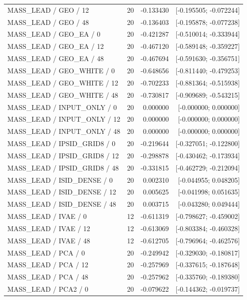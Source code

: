 \begin{longtable}{p{.56\linewidth}rrr}
MASS\_LEAD / GEO / 12 & 20 & -0.133430 & [-0.195505; -0.072244] \\
MASS\_LEAD / GEO / 48 & 20 & -0.136403 & [-0.195878; -0.077238] \\
MASS\_LEAD / GEO\_EA / 0 & 20 & -0.421287 & [-0.510014; -0.333944] \\
MASS\_LEAD / GEO\_EA / 12 & 20 & -0.467120 & [-0.589148; -0.359227] \\
MASS\_LEAD / GEO\_EA / 48 & 20 & -0.467694 & [-0.591630; -0.356751] \\
MASS\_LEAD / GEO\_WHITE / 0 & 20 & -0.648656 & [-0.811440; -0.479253] \\
MASS\_LEAD / GEO\_WHITE / 12 & 20 & -0.702233 & [-0.881364; -0.515938] \\
MASS\_LEAD / GEO\_WHITE / 48 & 20 & -0.730817 & [-0.909689; -0.543215] \\
MASS\_LEAD / INPUT\_ONLY / 0 & 20 & 0.000000 & [-0.000000; 0.000000] \\
MASS\_LEAD / INPUT\_ONLY / 12 & 20 & 0.000000 & [-0.000000; 0.000000] \\
MASS\_LEAD / INPUT\_ONLY / 48 & 20 & 0.000000 & [-0.000000; 0.000000] \\
MASS\_LEAD / IPSID\_GRID8 / 0 & 20 & -0.219644 & [-0.327051; -0.122800] \\
MASS\_LEAD / IPSID\_GRID8 / 12 & 20 & -0.298878 & [-0.430462; -0.173934] \\
MASS\_LEAD / IPSID\_GRID8 / 48 & 20 & -0.331815 & [-0.462729; -0.212094] \\
MASS\_LEAD / ISID\_DENSE / 0 & 20 & 0.002310 & [-0.044955; 0.048205] \\
MASS\_LEAD / ISID\_DENSE / 12 & 20 & 0.005625 & [-0.041998; 0.051635] \\
MASS\_LEAD / ISID\_DENSE / 48 & 20 & 0.003715 & [-0.043280; 0.049444] \\
MASS\_LEAD / IVAE / 0 & 12 & -0.611319 & [-0.798627; -0.459002] \\
MASS\_LEAD / IVAE / 12 & 12 & -0.613069 & [-0.803384; -0.460328] \\
MASS\_LEAD / IVAE / 48 & 12 & -0.612705 & [-0.796964; -0.462576] \\
MASS\_LEAD / PCA / 0 & 20 & -0.249942 & [-0.329030; -0.180817] \\
MASS\_LEAD / PCA / 12 & 20 & -0.257969 & [-0.337615; -0.187648] \\
MASS\_LEAD / PCA / 48 & 20 & -0.257962 & [-0.335760; -0.189380] \\
MASS\_LEAD / PCA2 / 0 & 20 & -0.079622 & [-0.144362; -0.019737] \\

\end{longtable}

